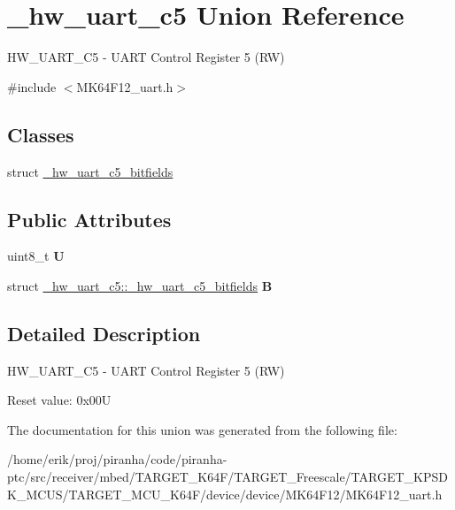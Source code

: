 \hypertarget{union__hw__uart__c5}{}\section{\+\_\+hw\+\_\+uart\+\_\+c5 Union Reference}
\label{union__hw__uart__c5}


H\+W\+\_\+\+U\+A\+R\+T\+\_\+\+C5 -\/ U\+A\+RT Control Register 5 (RW)  




{\ttfamily \#include $<$M\+K64\+F12\+\_\+uart.\+h$>$}

\subsection*{Classes}
\begin{DoxyCompactItemize}
\item 
struct \hyperlink{struct__hw__uart__c5_1_1__hw__uart__c5__bitfields}{\+\_\+hw\+\_\+uart\+\_\+c5\+\_\+bitfields}
\end{DoxyCompactItemize}
\subsection*{Public Attributes}
\begin{DoxyCompactItemize}
\item 
uint8\+\_\+t {\bfseries U}\hypertarget{union__hw__uart__c5_ae64eb942ac109ce56783a4aaa3590d63}{}\label{union__hw__uart__c5_ae64eb942ac109ce56783a4aaa3590d63}

\item 
struct \hyperlink{struct__hw__uart__c5_1_1__hw__uart__c5__bitfields}{\+\_\+hw\+\_\+uart\+\_\+c5\+::\+\_\+hw\+\_\+uart\+\_\+c5\+\_\+bitfields} {\bfseries B}\hypertarget{union__hw__uart__c5_af9cf755d4099c12b9ad2720023fdcf8a}{}\label{union__hw__uart__c5_af9cf755d4099c12b9ad2720023fdcf8a}

\end{DoxyCompactItemize}


\subsection{Detailed Description}
H\+W\+\_\+\+U\+A\+R\+T\+\_\+\+C5 -\/ U\+A\+RT Control Register 5 (RW) 

Reset value\+: 0x00U 

The documentation for this union was generated from the following file\+:\begin{DoxyCompactItemize}
\item 
/home/erik/proj/piranha/code/piranha-\/ptc/src/receiver/mbed/\+T\+A\+R\+G\+E\+T\+\_\+\+K64\+F/\+T\+A\+R\+G\+E\+T\+\_\+\+Freescale/\+T\+A\+R\+G\+E\+T\+\_\+\+K\+P\+S\+D\+K\+\_\+\+M\+C\+U\+S/\+T\+A\+R\+G\+E\+T\+\_\+\+M\+C\+U\+\_\+\+K64\+F/device/device/\+M\+K64\+F12/M\+K64\+F12\+\_\+uart.\+h\end{DoxyCompactItemize}
